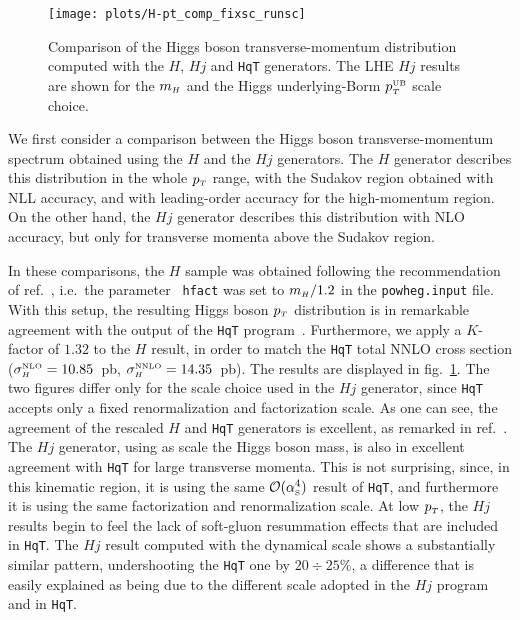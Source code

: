\documentclass[paper]{JHEP3}
\newcommand\HqT{{\tt HqT}}
\newcommand\mH{m_{\sss  H}}
\newcommand\sss{\mathchoice%
{\displaystyle}%
{\scriptstyle}%
{\scriptscriptstyle}%
{\scriptscriptstyle}%
}
\newcommand\as{\alpha_{\sss\rm S}}
\newcommand\pT{p_{\sss T}}
\begin{document}
\begin{figure}[htb]
\begin{center}
\texttt{[image: plots/H-pt\_comp\_fixsc\_runsc]} 
\caption{Comparison of the Higgs boson transverse-momentum distribution
  computed with the $H$, $Hj$ and \HqT{} generators. The LHE $Hj$ results are
  shown for the $\mH$ and the Higgs underlying-Borm $\pT^{\sss\rm UB}$
  scale choice.}
\label{fig:H-pt_comp}
\end{center}
\end{figure}
We first consider a comparison between the Higgs boson transverse-momentum
spectrum obtained using the $H$ and the $Hj$ generators. The $H$ generator
describes this distribution in the whole $\pT$ range, with the Sudakov region
obtained with NLL accuracy, and with leading-order accuracy for the
high-momentum region.  On the other hand, the $Hj$ generator describes this
distribution with NLO accuracy, but only for transverse momenta above the
Sudakov region.

In these comparisons, the $H$ sample was obtained following the
recommendation of ref.~\cite{Dittmaier:2012vm}, i.e.~the parameter {\tt
  hfact} was set to $\mH/1.2$ in the {\tt powheg.input} file. With this
setup, the resulting Higgs boson $\pT$ distribution is in remarkable
agreement with the output of the \HqT{} program~\cite{hqt, Bozzi:2003jy,
  Bozzi:2005wk, deFlorian:2011xf}.  Furthermore, we apply a $K$-factor of
$1.32$ to the $H$ result, in order to match the \HqT{} total NNLO cross
section ($\sigma_{\sss H}^{\sss \rm NLO} = 10.85$~pb, $\sigma_{\sss H}^{\sss
  \rm NNLO} = 14.35$~pb). The results are displayed in
fig.~\ref{fig:H-pt_comp}.  The two figures differ only for the scale choice
used in the $Hj$ generator, since \HqT{} accepts only a fixed renormalization
and factorization scale.  As one can see, the agreement of the rescaled $H$
and \HqT{} generators is excellent, as remarked in
ref.~\cite{Dittmaier:2012vm}. The $Hj$ generator, using as scale the Higgs
boson mass, is also in excellent agreement with \HqT{} for large transverse
momenta. This is not surprising, since, in this kinematic region, it is using
the same ${\cal O}(\as^4)$ result of \HqT{}, and furthermore it is using the
same factorization and renormalization scale.  At low $\pT$, the $Hj$ results
begin to feel the lack of soft-gluon resummation effects that are included in
\HqT{}.
The $Hj$ result computed with the dynamical scale shows a substantially
similar pattern, undershooting the \HqT{} one by $20\div 25$\%, a difference
that is easily explained as being due to the different scale adopted in the
$Hj$ program and in \HqT{}.
\end{document}
